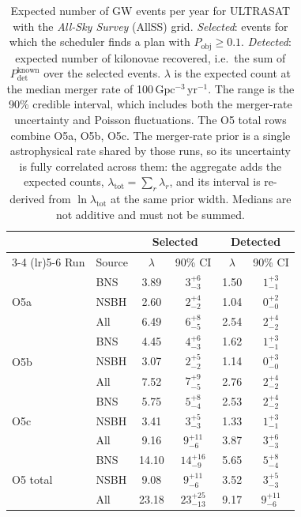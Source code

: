 \begin{table}[!htb]
\centering
\renewcommand\arraystretch{1.15}
\setlength{\tabcolsep}{0.22cm}
\caption{Expected number of GW events per year for ULTRASAT with the \emph{All-Sky Survey} (AllSS) grid. \emph{Selected}: events for which the scheduler finds a plan with $P_\mathrm{obj} \geq 0.1$. \emph{Detected}: expected number of kilonovae recovered, i.e.\ the sum of $P_\mathrm{det}^\mathrm{known}$ over the selected events. $\lambda$ is the expected count at the median merger rate of 100\,$\mathrm{Gpc^{-3}\,yr^{-1}}$. The range is the 90\% credible interval, which includes both the merger-rate uncertainty and Poisson fluctuations. The O5 total rows combine O5a, O5b, O5c. The merger-rate prior is a single astrophysical rate shared by those runs, so its uncertainty is fully correlated across them: the aggregate adds the expected counts, $\lambda_\mathrm{tot} = \sum_r \lambda_r$, and its interval is re-derived from $\ln \lambda_\mathrm{tot}$ at the same prior width. Medians are not additive and must not be summed.}
\label{tab:ultrasat-allsky-selected-detected-1yr}
\begin{tabular}{llcccc}
\toprule
 & & \multicolumn{2}{c}{Selected} & \multicolumn{2}{c}{Detected} \\
\cmidrule(lr){3-4} \cmidrule(lr){5-6}
Run & Source & $\lambda$ & 90\% CI & $\lambda$ & 90\% CI \\
\midrule
\multirow{3}{*}{O5a} & BNS  & 3.89 & $3^{+6}_{-3}$ & 1.50 & $1^{+3}_{-1}$ \\
                     & NSBH & 2.60 & $2^{+4}_{-2}$ & 1.04 & $0^{+2}_{-0}$ \\
                     & All  & 6.49 & $6^{+8}_{-5}$ & 2.54 & $2^{+4}_{-2}$ \\
\midrule
\multirow{3}{*}{O5b} & BNS  & 4.45 & $4^{+6}_{-3}$ & 1.62 & $1^{+3}_{-1}$ \\
                     & NSBH & 3.07 & $2^{+5}_{-2}$ & 1.14 & $0^{+3}_{-0}$ \\
                     & All  & 7.52 & $7^{+9}_{-5}$ & 2.76 & $2^{+4}_{-2}$ \\
\midrule
\multirow{3}{*}{O5c} & BNS  & 5.75 & $5^{+8}_{-4}$ & 2.53 & $2^{+4}_{-2}$ \\
                     & NSBH & 3.41 & $3^{+5}_{-3}$ & 1.33 & $1^{+3}_{-1}$ \\
                     & All  & 9.16 & $9^{+11}_{-6}$ & 3.87 & $3^{+6}_{-3}$ \\
\midrule
\multirow{3}{*}{O5 total} & BNS  & 14.10 & $14^{+16}_{-9}$ & 5.65 & $5^{+8}_{-4}$ \\
                          & NSBH & 9.08 & $9^{+11}_{-6}$ & 3.52 & $3^{+5}_{-3}$ \\
                          & All  & 23.18 & $23^{+25}_{-13}$ & 9.17 & $9^{+11}_{-6}$ \\
\bottomrule
\end{tabular}
\end{table}
